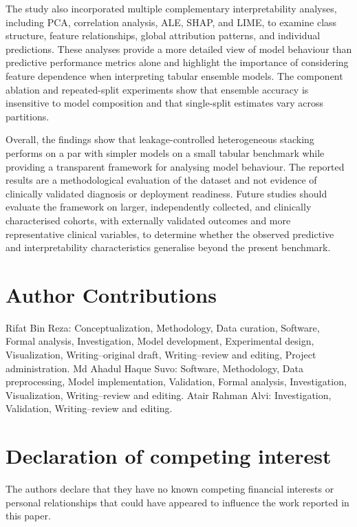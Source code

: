 \documentclass[a4paper,fleqn]{cas-dc}
\begin{document}
The study also incorporated multiple complementary interpretability analyses, including PCA, correlation analysis, ALE, SHAP, and LIME, to examine class structure, feature relationships, global attribution patterns, and individual predictions. These analyses provide a more detailed view of model behaviour than predictive performance metrics alone and highlight the importance of considering feature dependence when interpreting tabular ensemble models. The component ablation and repeated-split experiments show that ensemble accuracy is insensitive to model composition and that single-split estimates vary across partitions.

Overall, the findings show that leakage-controlled heterogeneous stacking performs on a par with simpler models on a small tabular benchmark while providing a transparent framework for analysing model behaviour. The reported results are a methodological evaluation of the dataset and not evidence of clinically validated diagnosis or deployment readiness. Future studies should evaluate the framework on larger, independently collected, and clinically characterised cohorts, with externally validated outcomes and more representative clinical variables, to determine whether the observed predictive and interpretability characteristics generalise beyond the present benchmark.



\section*{Author Contributions}

Rifat Bin Reza: Conceptualization, Methodology, Data curation, Software, Formal analysis, Investigation, Model development, Experimental design, Visualization, Writing--original draft, Writing--review and editing, Project administration. Md Ahadul Haque Suvo: Software, Methodology, Data preprocessing, Model implementation, Validation, Formal analysis, Investigation, Visualization, Writing--review and editing. Atair Rahman Alvi: Investigation, Validation, Writing--review and editing.



\section*{Declaration of competing interest}

The authors declare that they have no known competing financial interests or personal relationships that could have appeared to influence the work reported in this paper.
\end{document}
